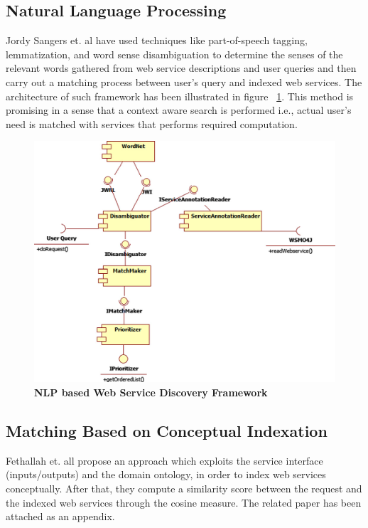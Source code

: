 \documentclass[12pt, oneside]{book}
\begin{document}
\subsection{Natural Language Processing}
Jordy Sangers et. al \cite{nlp} have used techniques like part-of-speech tagging, lemmatization, and word sense disambiguation to determine the senses of the relevant words gathered from web service descriptions and user queries and then carry out a matching process between user's query and indexed web services. The architecture of such framework has been illustrated in figure ~\ref{img: swsd}. This method is promising in a sense that a context aware search is performed i.e., actual user's need is matched with services that performs required computation.
\begin{figure}[h]
 \centering
 \includegraphics[width=\textwidth]{pics/swsd.png}
 \caption{\textbf{NLP based Web Service Discovery Framework}}
 \label{img: swsd}
\end{figure}


\subsection{Matching Based on Conceptual Indexation}
Fethallah et. all \cite{automated} propose an approach which exploits the service interface (inputs/outputs) and the domain ontology, in order to index web services conceptually. After that, they compute a similarity score between the request and the indexed web services through the cosine measure. The related paper has been attached as an appendix.
\end{document}
